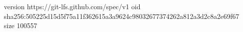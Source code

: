 version https://git-lfs.github.com/spec/v1
oid sha256:505225d15d5f75a11f362615a3a9624c98032677374262a812a3d2c8a2e69f67
size 100557
